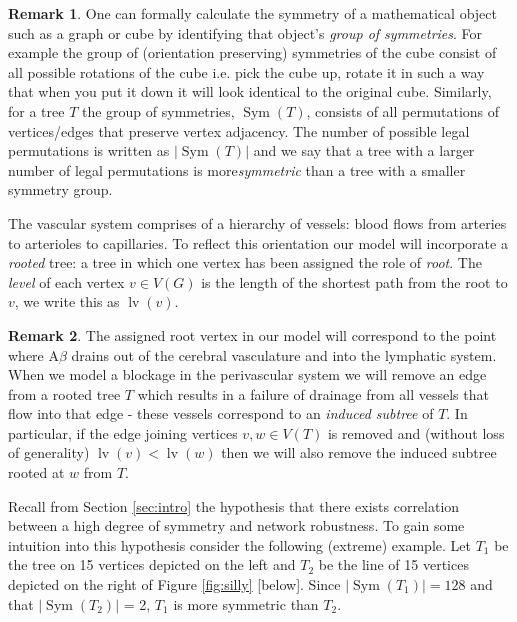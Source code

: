\documentclass[12pt]{article} %
\theoremstyle{definition}
\newtheorem*{rem}{Remark}
\DeclareMathOperator{\Sym}{Sym}
\DeclareMathOperator{\lv}{lv}
\begin{document}
\begin{rem}
One can formally calculate the symmetry of a mathematical object such as a graph or cube by identifying that object's \emph{group of symmetries}.  For example the group of (orientation preserving) symmetries of the cube consist of all possible rotations of the cube i.e. pick the cube up, rotate it in such a way that when you put it down it will look identical to the original cube.  Similarly, for a tree $T$ the group of symmetries, $\Sym(T)$, consists of all permutations of vertices/edges that preserve vertex adjacency. The number of possible legal permutations is written as $|\Sym(T)|$ and we say that a tree with a larger number of legal permutations is more\emph{symmetric} than a tree with a smaller symmetry group.  
\end{rem}

The vascular system comprises of a hierarchy of vessels: blood flows from arteries to arterioles to capillaries.  To reflect this orientation our model will incorporate a \emph{rooted} tree: a tree in which one vertex has been assigned the role of \emph{root}.  The \emph{level} of each vertex $v \in V(G)$ is the length of the shortest path from the root to $v$, we write this as $\lv(v)$.


\begin{rem}
 The assigned root vertex in our model will correspond to the point where A$\beta$ drains out of the cerebral vasculature and into the lymphatic system.  When we model a blockage in the perivascular system we will remove an edge from a rooted tree $T$ which results in a failure of drainage from all vessels that flow into that edge  - these vessels correspond to an \emph{induced subtree} of $T$.  In particular,  if the edge joining vertices $v,w \in V(T)$ is removed and (without loss of generality) $\lv(v) < \lv(w)$ then we will also remove the induced subtree rooted at $w$ from $T$.     
\end{rem}

Recall from Section \ref{sec:intro} the hypothesis that there exists correlation between a high degree of symmetry and network robustness. To gain some intuition into this hypothesis consider the following (extreme) example.  Let $T_1$ be the tree on 15 vertices depicted on the left and $T_{2}$ be the line of 15 vertices depicted on the right of Figure \ref{fig:silly} [below].  Since $|\Sym(T_{1})| = 128$ and that $|\Sym(T_{2})|$ = 2, $T_{1}$ is more symmetric than $T_{2}$.  
\end{document}
